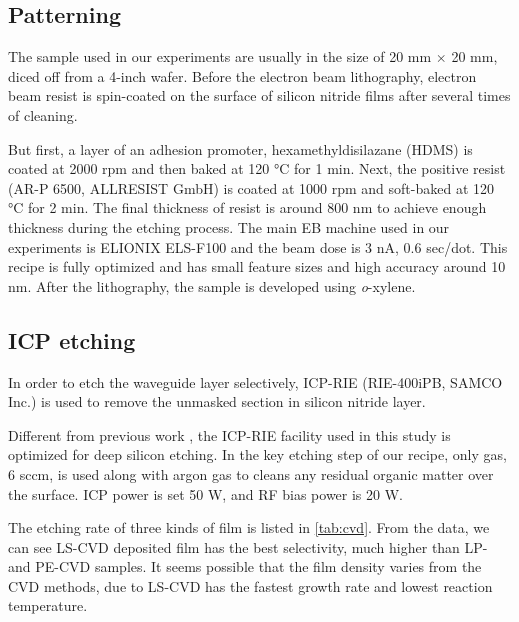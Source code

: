 \subsection{Patterning}
The sample used in our experiments are usually in the size of 20 mm $\times$ 20 mm, diced off from a 4-inch wafer. Before the electron beam lithography, electron beam resist is spin-coated on the surface of silicon nitride films after several times of cleaning. 

But first, a layer of an adhesion promoter, hexamethyldisilazane (HDMS) is coated at 2000 rpm and then baked at 120 \si{\celsius} for 1 min. Next, the positive resist (AR-P 6500, ALLRESIST GmbH) is coated at 1000 rpm and soft-baked at 120 \si{\celsius} for 2 min. The final thickness of resist is around 800 nm to achieve enough thickness during the etching process. The main EB machine used in our experiments is ELIONIX ELS-F100 and the beam dose is 3 nA, 0.6 sec/dot. This recipe is fully optimized and has small feature sizes and high accuracy around 10 nm. After the lithography, the sample is developed using \textit{o}-xylene. 


\subsection{ICP etching}

In order to etch the waveguide layer selectively, ICP-RIE (RIE-400iPB, SAMCO Inc.) is used to remove the unmasked section in silicon nitride layer.

Different from previous work \cite{Yusuke2017}, the ICP-RIE facility used in this study is optimized for deep silicon etching. In the key etching step of our recipe, only  gas, 6 sccm, is used along with argon gas to cleans any residual organic matter over the surface. ICP power is set 50 W, and RF bias power is 20 W.

The etching rate of three kinds of film is listed in \autoref{tab:cvd}. From the data, we can see LS-CVD deposited film has the best selectivity, much higher than LP- and PE-CVD samples. It seems possible that the film density varies from the CVD methods, due to LS-CVD has the fastest growth rate and lowest reaction temperature.

